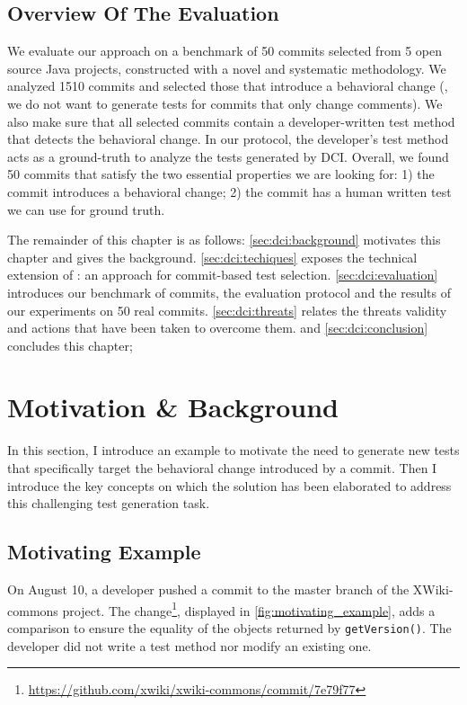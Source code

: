 \subsection{Overview Of The Evaluation}
\label{subsec:dci:introduction:evaluation}
We evaluate our approach on a benchmark of 50 commits selected from 5 open source Java projects, constructed with a novel and systematic methodology.
We analyzed 1510 commits and selected those that introduce a behavioral change (\eg, we do not want to generate tests for commits that only change comments).
We also make sure that all selected commits contain a developer-written test method that detects the behavioral change.
In our protocol, the developer's test method acts as a ground-truth to analyze the tests generated by DCI.
Overall, we found 50 commits that satisfy the two essential properties we are looking for:
1) the commit introduces a behavioral change;
2) the commit has a human written test we can use for ground truth.

The remainder of this chapter is as follows:
\autoref{sec:dci:background} motivates this chapter and gives the background.
\autoref{sec:dci:techiques} exposes the technical extension of \dspot: an approach for commit-based test selection. 
\autoref{sec:dci:evaluation} introduces our benchmark of commits, the evaluation protocol and the results of our experiments on 50 real commits. 
\autoref{sec:dci:threats} relates the threats validity and actions that have been taken to overcome them. 
and \autoref{sec:dci:conclusion} concludes this chapter;

\section{Motivation \& Background}
\label{sec:dci:background}

In this section, I introduce an example to motivate the need to generate new tests that specifically target the behavioral change introduced by a commit.
Then I introduce the key concepts on which the solution has been elaborated to address this challenging test generation task.

\subsection{Motivating Example}
\label{subsec:dci:background:example}

On August 10, a developer pushed a commit to the master branch of the XWiki-commons project. 
The change\footnote{\url{https://github.com/xwiki/xwiki-commons/commit/7e79f77}}, displayed in \autoref{fig:motivating_example}, adds a comparison to ensure the equality of the objects returned by \texttt{getVersion()}.
The developer did not write a test method nor modify an existing one. 

